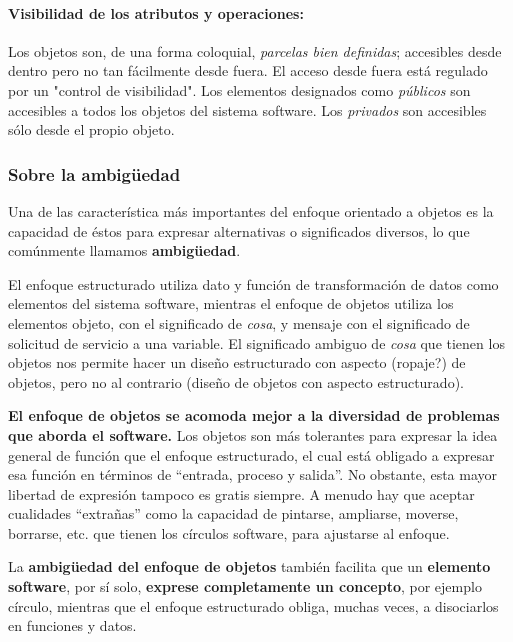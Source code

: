 \vspace{5mm}

\paragraph{Visibilidad de los atributos y operaciones:} Los objetos
son, de una forma coloquial, \emph{parcelas bien definidas};
accesibles desde dentro pero no tan fácilmente desde fuera. El acceso
desde fuera está regulado por un "control de visibilidad".
Los elementos designados como \emph{públicos} son accesibles a todos
los objetos del sistema software. Los \emph{privados} son accesibles
sólo desde el propio objeto.

\subsubsection{Sobre la ambigüedad} Una de las característica más
importantes del enfoque orientado a objetos es la capacidad de éstos
para expresar alternativas o significados diversos, lo que comúnmente
llamamos \textbf{ambigüedad}.

\vspace{5mm}

El enfoque estructurado utiliza dato y función de transformación de
datos como elementos del sistema software, mientras el enfoque de
objetos utiliza los elementos objeto, con el significado de
\emph{cosa}, y mensaje con el significado de solicitud de servicio a
una variable.  El significado ambiguo de \emph{cosa} que tienen los
objetos nos permite hacer un diseño estructurado con aspecto (ropaje?)
de objetos, pero no al contrario (diseño de objetos con aspecto
estructurado).

\vspace{5mm}

\textbf{El enfoque de objetos se acomoda mejor a la diversidad de
  problemas que aborda el software.}  Los objetos son más tolerantes
para expresar la idea general de función que el enfoque estructurado,
el cual está obligado a expresar esa función en términos de “entrada,
proceso y salida”.  No obstante, esta mayor libertad de expresión
tampoco es gratis siempre. A menudo hay que aceptar cualidades
“extrañas” como la capacidad de pintarse, ampliarse, moverse,
borrarse, etc.  que tienen los círculos software, para ajustarse al
enfoque.

\vspace{5mm}

La \textbf{ambigüedad del enfoque de objetos} también facilita que un
\textbf{elemento software}, por sí solo, \textbf{exprese completamente
  un concepto}, por ejemplo círculo, mientras que el enfoque
estructurado obliga, muchas veces, a disociarlos en funciones y datos.


